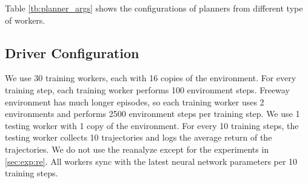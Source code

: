 Table \ref{tb:planner_args} shows the configurations of planners from different type of workers.

\subsection{Driver Configuration}
We use 30 training workers, each with 16 copies of the environment.
For every training step, each training worker performs 100 environment steps.
Freeway environment has much longer episodes, so each training worker uses 2 environments and performs 2500 environment steps per training step.
We use 1 testing worker with 1 copy of the environment.
For every 10 training steps, the testing worker collects 10 trajectories and logs the average return of the trajectories.
We do not use the reanalyze except for the experiments in \ref{sec:exp:re}.
All workers sync with the latest neural network parameters per 10 training steps.

